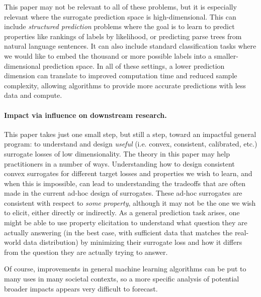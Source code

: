 \documentclass{article}
\begin{document}
This paper may not be relevant to all of these problems, but it is especially relevant where the surrogate prediction space is high-dimensional.
This can include \emph{structured prediction} problems where the goal is to learn to predict properties like rankings of labels by likelihood, or predicting parse trees from natural language sentences.
It can also include standard classification tasks where we would like to embed the thousand or more possible labels into a smaller-dimensional prediction space.
In all of these settings, a lower prediction dimension can translate to improved computation time and reduced sample complexity, allowing algorithms to provide more accurate predictions with less data and compute.

\paragraph{Impact via influence on downstream research.}
This paper takes just one small step, but still a step, toward an impactful general program: to understand and design \emph{useful} (i.e. convex, consistent, calibrated, etc.) surrogate losses of low dimensionality.
The theory in this paper may help practitioners in a number of ways.
Understanding how to design consistent convex surrogates for different target losses and properties we wish to learn, and when this is impossible, can lead to understanding the tradeoffs that are often made in the current ad-hoc design of surrogates.
These ad-hoc surrogates are consistent with respect to \emph{some property}, although it may not be the one we wish to elicit, either directly or indirectly.
As a general prediction task arises, one might be able to use property elicitation to understand what question they are actually answering (in the best case, with sufficient data that matches the real-world data distribution) by minimizing their surrogate loss and how it differs from the question they are actually trying to answer.

Of course, improvements in general machine learning algorithms can be put to many uses in many societal contexts, so a more specific analysis of potential broader impacts appears very difficult to forecast.


\end{document}
